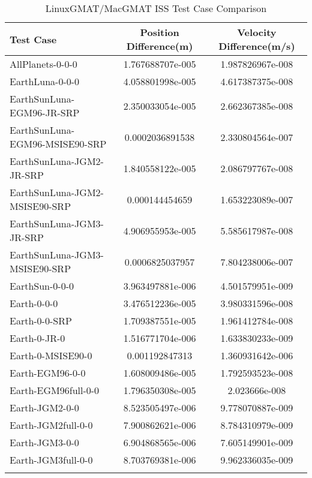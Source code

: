 \begin{table}[htbp!]
\centering
\caption{ LinuxGMAT/MacGMAT ISS Test Case Comparison}
      \begin{tabular}{lcc}
      \hline\hline
          Test Case & Position Difference(m) & Velocity Difference(m/s) \\
         \hline
         AllPlanets-0-0-0 & 1.767688707e-005 & 1.987826967e-008 \\
         EarthLuna-0-0-0 & 4.058801998e-005 & 4.617387375e-008 \\
         EarthSunLuna-EGM96-JR-SRP & 2.350033054e-005 & 2.662367385e-008 \\
         EarthSunLuna-EGM96-MSISE90-SRP & 0.0002036891538 & 2.330804564e-007 \\
         EarthSunLuna-JGM2-JR-SRP & 1.840558122e-005 & 2.086797767e-008 \\
         EarthSunLuna-JGM2-MSISE90-SRP & 0.000144454659 & 1.653223089e-007 \\
         EarthSunLuna-JGM3-JR-SRP & 4.906955953e-005 & 5.585617987e-008 \\
         EarthSunLuna-JGM3-MSISE90-SRP & 0.0006825037957 & 7.804238006e-007 \\
         EarthSun-0-0-0 & 3.963497881e-006 & 4.501579951e-009 \\
         Earth-0-0-0 & 3.476512236e-005 & 3.980331596e-008 \\
         Earth-0-0-SRP & 1.709387551e-005 & 1.961412784e-008 \\
         Earth-0-JR-0 & 1.516771704e-006 & 1.633830233e-009 \\
         Earth-0-MSISE90-0 & 0.001192847313 & 1.360931642e-006 \\
         Earth-EGM96-0-0 & 1.608009486e-005 & 1.792593523e-008 \\
         Earth-EGM96full-0-0 & 1.796350308e-005 & 2.023666e-008 \\
         Earth-JGM2-0-0 & 8.523505497e-006 & 9.778070887e-009 \\
         Earth-JGM2full-0-0 & 7.900862621e-006 & 8.784310979e-009 \\
         Earth-JGM3-0-0 & 6.904868565e-006 & 7.605149901e-009 \\
         Earth-JGM3full-0-0 & 8.703769381e-006 & 9.962336035e-009 \\
      \hline\hline
      \label{Table: ISS LinuxGMAT-MacGMAT Table} 
\end{tabular}
\end{table}
